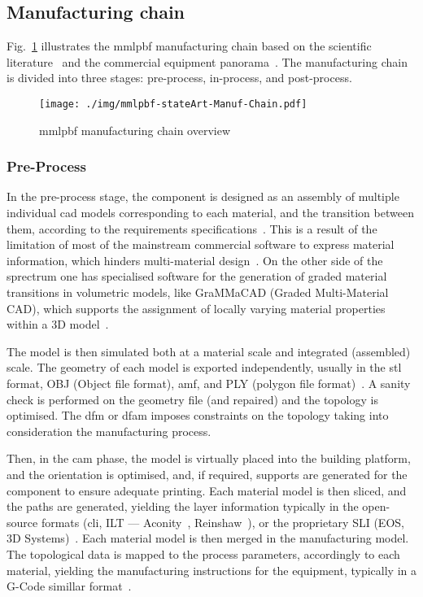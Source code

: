 \subsection{Manufacturing chain}%
\label{sec:manuf-chain-equipm}
Fig.~\ref{fig:mmlpbf-stateArt-Manuf-Chain} illustrates the \gls{mmlpbf}
manufacturing chain based on the scientific literature~\cite{seidel2022multi} and the commercial
equipment panorama~\cite{aconityMachinesSite, slm500, eosM300, renishawAM500,
  trumpfTruprint500, auroraLabsRMP1}. 
The manufacturing chain is divided into three stages: pre-process,
in-process, and post-process.
%
\begin{figure}[!hbtp]
  \centering
    \texttt{[image: ./img/mmlpbf-stateArt-Manuf-Chain.pdf]}%
    \caption[MMLPBF manufacturing chain overview]{\gls{mmlpbf} manufacturing chain overview}%
    \label{fig:mmlpbf-stateArt-Manuf-Chain}
  \end{figure}


\subsubsection{Pre-Process}%
\label{sec:pre-process}
In the pre-process stage, the component is designed as an
assembly of multiple individual \gls{cad} models corresponding to each
material, and the transition between them, according to
the requirements specifications~\cite{altenhofen2018continuous, yao2018multi}.
This is a result of the limitation of most of the mainstream commercial
software to express material information, which hinders multi-material
design~\cite{wang2022recent}. On the other side of the sprectrum one has specialised software
for the generation of graded material transitions in volumetric models, like
GraMMaCAD (Graded Multi-Material CAD), which supports the assignment of
locally varying material properties within a 3D model~\cite{grammacad}.

The model is then simulated both at a
material scale and integrated (assembled) scale. The geometry of each model
is exported independently, usually in the \gls{stl} format, OBJ (Object file format), \gls{amf}, and PLY (polygon file
format)~\cite{loh2018overview}. A sanity check is performed on the geometry
file (and repaired) and the topology is optimised. The \gls{dfm} or
\gls{dfam} imposes constraints on the topology taking into consideration the
manufacturing process.

Then, in the \gls{cam} phase, the model is virtually
placed into the building platform, and the orientation is optimised, and, if
required, supports are generated for the component to ensure adequate
printing. Each material model is then sliced, and the paths are generated,
yielding the layer information typically in the open-source formats
(\gls{cli}, ILT --- Aconity~\cite{aconityMachinesSite}, Reinshaw~\cite{renishawAM500}), or the proprietary SLI (EOS, 3D
Systems)~\cite{zeng2013layer}. Each material model is then merged in the
manufacturing model. The topological data is mapped to the process parameters,
accordingly to each material, yielding the manufacturing instructions for
the equipment, typically in a G-Code simillar
format~\cite{nadimpali2019MMSteels}.

